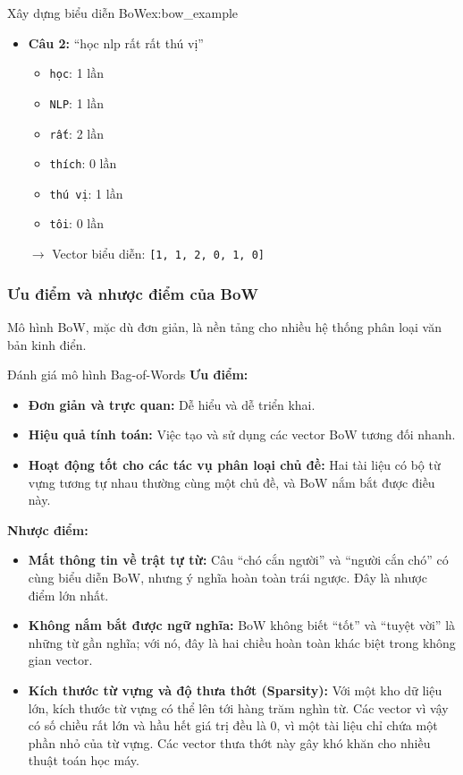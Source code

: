 \begin{example}{Xây dựng biểu diễn BoW}{ex:bow_example}
\begin{itemize}
        \item \textbf{Câu 2:} “học nlp rất rất thú vị”
            \begin{itemize}
                \item \texttt{học}: 1 lần
                \item \texttt{NLP}: 1 lần
                \item \texttt{rất}: 2 lần
                \item \texttt{thích}: 0 lần
                \item \texttt{thú vị}: 1 lần
                \item \texttt{tôi}: 0 lần
            \end{itemize}
            \(\rightarrow\) Vector biểu diễn: \texttt{[1, 1, 2, 0, 1, 0]}
    \end{itemize}
\end{example}
\subsubsection{Ưu điểm và nhược điểm của BoW}
Mô hình BoW, mặc dù đơn giản, là nền tảng cho nhiều hệ thống phân loại văn bản kinh điển.
\begin{assess}{Đánh giá mô hình Bag-of-Words}
\textbf{Ưu điểm:}
\begin{itemize}
    \item \textbf{Đơn giản và trực quan:} Dễ hiểu và dễ triển khai.
    \item \textbf{Hiệu quả tính toán:} Việc tạo và sử dụng các vector BoW tương đối nhanh.
    \item \textbf{Hoạt động tốt cho các tác vụ phân loại chủ đề:} Hai tài liệu có bộ từ vựng tương tự nhau thường cùng một chủ đề, và BoW nắm bắt được điều này.
\end{itemize}
\textbf{Nhược điểm:}
\begin{itemize}
    \item \textbf{Mất thông tin về trật tự từ:} Câu “chó cắn người” và “người cắn chó” có cùng biểu diễn BoW, nhưng ý nghĩa hoàn toàn trái ngược. Đây là nhược điểm lớn nhất.
    \item \textbf{Không nắm bắt được ngữ nghĩa:} BoW không biết “tốt” và “tuyệt vời” là những từ gần nghĩa; với nó, đây là hai chiều hoàn toàn khác biệt trong không gian vector.
    \item \textbf{Kích thước từ vựng và độ thưa thớt (Sparsity):} Với một kho dữ liệu lớn, kích thước từ vựng có thể lên tới hàng trăm nghìn từ. Các vector vì vậy có số chiều rất lớn và hầu hết giá trị đều là 0, vì một tài liệu chỉ chứa một phần nhỏ của từ vựng. Các vector thưa thớt này gây khó khăn cho nhiều thuật toán học máy.
\end{itemize}
\end{assess}


